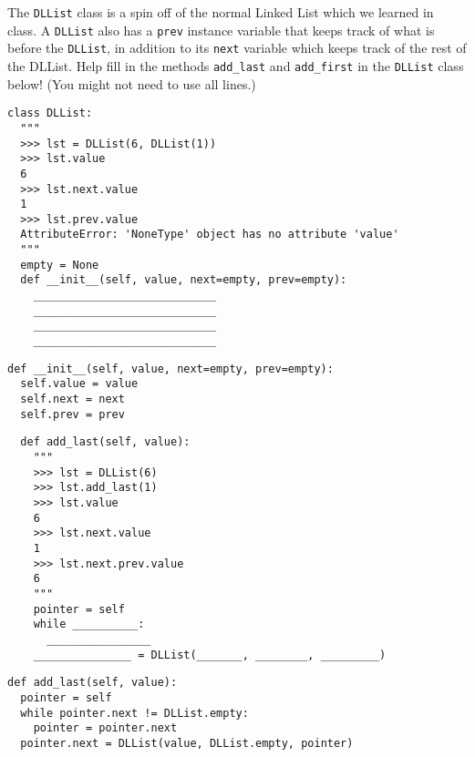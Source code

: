 \begin{blocksection}
\question The \lstinline{DLList} class is a spin off of the normal Linked List which we learned in class. A \lstinline{DLList} also has a \lstinline{prev} instance variable that keeps track of what is before the \lstinline{DLList}, in addition to its \lstinline{next} variable which keeps track of the rest of the DLList. Help fill in the methods \lstinline{add_last} and \lstinline{add_first} in the \lstinline{DLList} class below! (You might not need to use all lines.)

\begin{lstlisting}
class DLList:
  """
  >>> lst = DLList(6, DLList(1))
  >>> lst.value
  6
  >>> lst.next.value
  1
  >>> lst.prev.value
  AttributeError: 'NoneType' object has no attribute 'value'
  """
  empty = None
  def __init__(self, value, next=empty, prev=empty):
    ____________________________
    ____________________________
    ____________________________
    ____________________________
\end{lstlisting}

\begin{solution}
\begin{lstlisting}
def __init__(self, value, next=empty, prev=empty):
  self.value = value
  self.next = next
  self.prev = prev
\end{lstlisting}
\end{solution}
\end{blocksection}

\begin{blocksection}
\begin{lstlisting}
  def add_last(self, value):
    """
    >>> lst = DLList(6)
    >>> lst.add_last(1)
    >>> lst.value
    6
    >>> lst.next.value
    1
    >>> lst.next.prev.value
    6
    """
    pointer = self
    while __________:
      ________________
    _______________ = DLList(_______, ________, _________)
\end{lstlisting}

\begin{solution}
\begin{lstlisting}
def add_last(self, value):
  pointer = self
  while pointer.next != DLList.empty:
    pointer = pointer.next
  pointer.next = DLList(value, DLList.empty, pointer)
\end{lstlisting}
\end{solution}
\end{blocksection}

